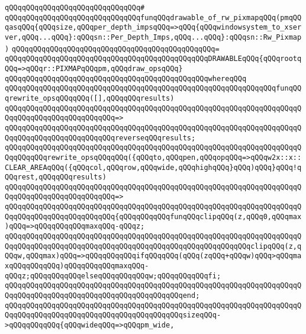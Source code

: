 \verb|qQQqqQQqqQQqqQQqqQQqqQQqqQQqqQQq#|\newline
\verb|qQQqqQQqqQQqqQQqqQQqqQQqqQQqqQQqfunqQQqdrawable_of_rw_pixmapqQQq(pmqQQqasqQQq{qQQqsize,qQQqper_depth_impsqQQq=>qQQq{qQQqwindowsystem_to_xserver,qQQq...qQQq}:qQQqsn::Per_Depth_Imps,qQQq...qQQq}:qQQqsn::Rw_Pixmap)|\newline
\verb|qQQqqQQqqQQqqQQqqQQqqQQqqQQqqQQqqQQqqQQqqQQqqQQq=|\newline
\verb|qQQqqQQqqQQqqQQqqQQqqQQqqQQqqQQqqQQqqQQqqQQqqQQqDRAWABLEqQQq{qQQqrootqQQq=>qQQqr::PIXMAPqQQqpm,qQQqdraw_opsqQQq}|\newline
\verb|qQQqqQQqqQQqqQQqqQQqqQQqqQQqqQQqqQQqqQQqqQQqqQQqwhereqQQq|\newline
\verb|qQQqqQQqqQQqqQQqqQQqqQQqqQQqqQQqqQQqqQQqqQQqqQQqqQQqqQQqqQQqqQQqfunqQQqrewrite_opsqQQqqQQq([],qQQqqQQqresults)|\newline
\verb|qQQqqQQqqQQqqQQqqQQqqQQqqQQqqQQqqQQqqQQqqQQqqQQqqQQqqQQqqQQqqQQqqQQqqQQqqQQqqQQqqQQqqQQqqQQqqQQq=>|\newline
\verb|qQQqqQQqqQQqqQQqqQQqqQQqqQQqqQQqqQQqqQQqqQQqqQQqqQQqqQQqqQQqqQQqqQQqqQQqqQQqqQQqqQQqqQQqqQQqqQQqreverseqQQqresults;|\newline
\newline
\verb|qQQqqQQqqQQqqQQqqQQqqQQqqQQqqQQqqQQqqQQqqQQqqQQqqQQqqQQqqQQqqQQqqQQqqQQqqQQqqQQqrewrite_opsqQQqqQQq({qQQqto,qQQqpen,qQQqopqQQq=>qQQqw2x::x::CLEAR_AREAqQQq({qQQqcol,qQQqrow,qQQqwide,qQQqhighqQQq}qQQq)qQQq}qQQq!qQQqrest,qQQqqQQqresults)|\newline
\verb|qQQqqQQqqQQqqQQqqQQqqQQqqQQqqQQqqQQqqQQqqQQqqQQqqQQqqQQqqQQqqQQqqQQqqQQqqQQqqQQqqQQqqQQqqQQqqQQq=>|\newline
\verb|qQQqqQQqqQQqqQQqqQQqqQQqqQQqqQQqqQQqqQQqqQQqqQQqqQQqqQQqqQQqqQQqqQQqqQQqqQQqqQQqqQQqqQQqqQQqqQQq{qQQqqQQqqQQqfunqQQqclipqQQq(z,qQQq0,qQQqmax)qQQq=>qQQqqQQqqQQqmaxqQQq-qQQqz;|\newline
\verb|qQQqqQQqqQQqqQQqqQQqqQQqqQQqqQQqqQQqqQQqqQQqqQQqqQQqqQQqqQQqqQQqqQQqqQQqqQQqqQQqqQQqqQQqqQQqqQQqqQQqqQQqqQQqqQQqqQQqqQQqqQQqqQQqclipqQQq(z,qQQqw,qQQqmax)qQQq=>qQQqqQQqqQQqifqQQqqQQq(qQQq(zqQQq+qQQqw)qQQq>qQQqmaxqQQqqQQqqQQq)qQQqqQQqqQQqmaxqQQq-qQQqz;qQQqqQQqqQQqelseqQQqqQQqqQQqw;qQQqqQQqqQQqfi;|\newline
\verb|qQQqqQQqqQQqqQQqqQQqqQQqqQQqqQQqqQQqqQQqqQQqqQQqqQQqqQQqqQQqqQQqqQQqqQQqqQQqqQQqqQQqqQQqqQQqqQQqqQQqqQQqqQQqqQQqend;|\newline
\newline
\verb|qQQqqQQqqQQqqQQqqQQqqQQqqQQqqQQqqQQqqQQqqQQqqQQqqQQqqQQqqQQqqQQqqQQqqQQqqQQqqQQqqQQqqQQqqQQqqQQqqQQqqQQqqQQqqQQqsizeqQQq->qQQqqQQqqQQq{qQQqwideqQQq=>qQQqpm_wide,|\newline
